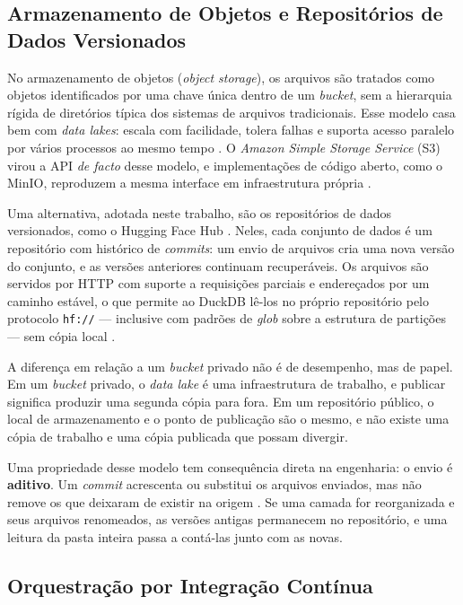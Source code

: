 \subsection{Armazenamento de Objetos e Repositórios de Dados Versionados}

No armazenamento de objetos (\textit{object storage}), os arquivos são tratados como objetos identificados por uma chave única dentro de um \textit{bucket}, sem a hierarquia rígida de diretórios típica dos sistemas de arquivos tradicionais. Esse modelo casa bem com \textit{data lakes}: escala com facilidade, tolera falhas e suporta acesso paralelo por vários processos ao mesmo tempo \cite{Reis2022}. O \textit{Amazon Simple Storage Service} (S3) virou a API \textit{de facto} desse modelo, e implementações de código aberto, como o MinIO, reproduzem a mesma interface em infraestrutura própria \cite{MinIO2024}.

Uma alternativa, adotada neste trabalho, são os repositórios de dados versionados, como o Hugging Face Hub \cite{HuggingFaceDatasets2026}. Neles, cada conjunto de dados é um repositório com histórico de \textit{commits}: um envio de arquivos cria uma nova versão do conjunto, e as versões anteriores continuam recuperáveis. Os arquivos são servidos por HTTP com suporte a requisições parciais e endereçados por um caminho estável, o que permite ao DuckDB lê-los no próprio repositório pelo protocolo \texttt{hf://} --- inclusive com padrões de \textit{glob} sobre a estrutura de partições --- sem cópia local \cite{DuckDB2024}.

A diferença em relação a um \textit{bucket} privado não é de desempenho, mas de papel. Em um \textit{bucket} privado, o \textit{data lake} é uma infraestrutura de trabalho, e publicar significa produzir uma segunda cópia para fora. Em um repositório público, o local de armazenamento e o ponto de publicação são o mesmo, e não existe uma cópia de trabalho e uma cópia publicada que possam divergir.

Uma propriedade desse modelo tem consequência direta na engenharia: o envio é \textbf{aditivo}. Um \textit{commit} acrescenta ou substitui os arquivos enviados, mas não remove os que deixaram de existir na origem \cite{HuggingFaceDatasets2026}. Se uma camada for reorganizada e seus arquivos renomeados, as versões antigas permanecem no repositório, e uma leitura da pasta inteira passa a contá-las junto com as novas.

\subsection{Orquestração por Integração Contínua}
\label{subsec:orquestracao}

